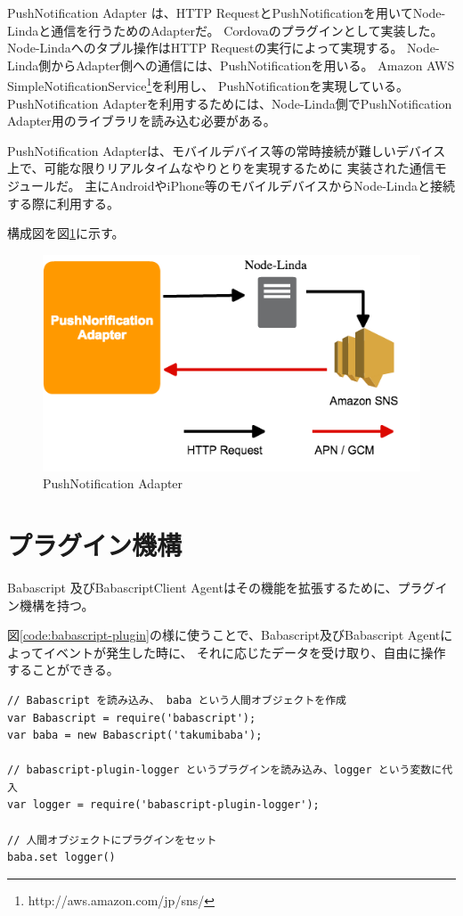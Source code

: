 PushNotification Adapter は、HTTP
RequestとPushNotificationを用いてNode-Lindaと通信を行うためのAdapterだ。
Cordovaのプラグインとして実装した。 Node-Lindaへのタプル操作はHTTP
Requestの実行によって実現する。
Node-Linda側からAdapter側への通信には、PushNotificationを用いる。 Amazon
AWS
SimpleNotificationService\footnote{http://aws.amazon.com/jp/sns/}を利用し、
PushNotificationを実現している。 PushNotification
Adapterを利用するためには、Node-Linda側でPushNotification
Adapter用のライブラリを読み込む必要がある。

PushNotification
Adapterは、モバイルデバイス等の常時接続が難しいデバイス上で、可能な限りリアルタイムなやりとりを実現するために
実装された通信モジュールだ。
主にAndroidやiPhone等のモバイルデバイスからNode-Lindaと接続する際に利用する。

構成図を図\ref{fig:push-notification-adapter}に示す。

\begin{figure}[htbp]
  \begin{center}
  \includegraphics[width=.5\linewidth,bb=0 0 529 303]{images/push-notification-adapter.png}
  \end{center}
  \caption{PushNotification Adapter}
  \label{fig:push-notification-adapter}
\end{figure}

\section{プラグイン機構}\label{ux30d7ux30e9ux30b0ux30a4ux30f3ux6a5fux69cb}

Babascript 及びBabascriptClient
Agentはその機能を拡張するために、プラグイン機構を持つ。

図\ref{code:babascript-plugin}の様に使うことで、Babascript及びBabascript
Agentによってイベントが発生した時に、
それに応じたデータを受け取り、自由に操作することができる。

\begin{lstlisting}[caption=Babascript Plugin, label=code:babascript-plugin]
// Babascript を読み込み、 baba という人間オブジェクトを作成
var Babascript = require('babascript');
var baba = new Babascript('takumibaba');

// babascript-plugin-logger というプラグインを読み込み、logger という変数に代入
var logger = require('babascript-plugin-logger');

// 人間オブジェクトにプラグインをセット
baba.set logger()
\end{lstlisting}

